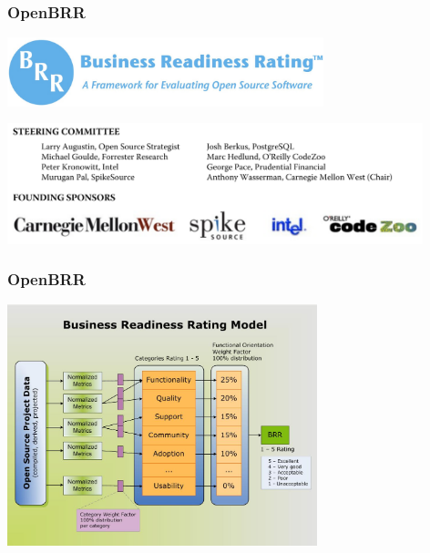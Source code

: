 \documentclass[17pt,aspectratio=169,hyperref=pdfusetitle]{beamer}
\begin{document}
\begin{frame}[fragile]
  \frametitle{OpenBRR}

  
  \begin{center}
  \includegraphics[height=2cm]{figs/openbrr}

  \includegraphics[height=3.5cm]{figs/openbrr-authors}
  \end{center}  
  
\end{frame}

\begin{frame}[fragile]
  \frametitle{OpenBRR}

  
  \begin{center}
  \includegraphics[height=7cm]{figs/openbrr-model}
  \end{center}  
  
\end{frame}


  
\end{document}
